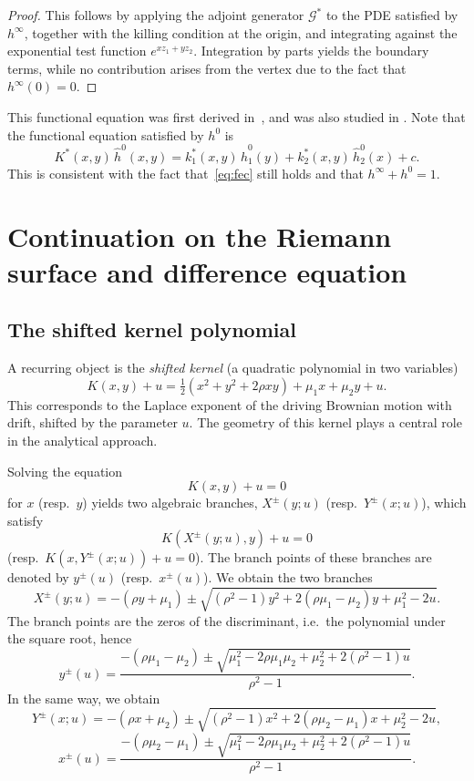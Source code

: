 \documentclass[11pt]{article}
\theoremstyle{definition}
\begin{document}
\begin{proof}
This follows by applying the adjoint generator $\mathcal{G}^*$ to the PDE satisfied by $h^\infty$, together with the killing condition at the origin, and integrating against the exponential test function $e^{x z_1+y z_2}$. Integration by parts yields the boundary terms, while no contribution arises from the vertex due to the fact that $h^\infty(0)=0$.
\end{proof}
This functional equation was first derived in~\cite{franceschi_ernst_huang_escape_2021}, and was also studied in
\cite{franceschi_flin_sumofexponential_2024}.
Note that the functional equation satisfied by $h^0$ is
\[
K^*(x,y)\,\widehat h^0(x,y)
=
k_1^*(x,y)\,\widehat h^0_1(y)
+
k_2^*(x,y)\,\widehat h^0_2(x)
+
c.
\]
This is consistent with the fact that~\eqref{eq:fec} still holds and that $h^\infty + h^0 = 1$.


\section{Continuation on the Riemann surface and difference equation}
\label{sec:contRiem}

\subsection{The shifted kernel polynomial}
\label{sec:shiftk}

A recurring object is the \emph{shifted kernel} (a quadratic polynomial in two variables)
\[
K(x,y)+u=\tfrac12(x^2+y^2+2\rho xy)+\mu_1 x+\mu_2 y + u.
\]
This corresponds to the Laplace exponent of the driving Brownian motion with drift, shifted by the parameter $u$. The geometry of this kernel plays a central role in the analytical approach.

Solving the equation 
$$K(x,y)+u=0$$ 
for $x$ (resp.\ $y$) yields two algebraic branches, $X^\pm(y;u)$ (resp.\ $Y^\pm(x;u)$), which satisfy $$K(X^\pm(y;u),y)+u=0$$ (resp.\ $K(x,Y^\pm(x;u))+u=0$). The branch points of these branches are denoted by $y^\pm(u)$ (resp.\ $x^\pm(u)$).
We obtain the two branches
\[
X^\pm(y;u)=-(\rho y+\mu_1)\pm \sqrt{(\rho^2-1)y^2+2(\rho\mu_1-\mu_2)y+\mu_1^2 - 2u}.
\]
The branch points are the zeros of the discriminant, i.e.\ the polynomial under the square root, hence
\[
y^\pm(u)=\frac{-(\rho\mu_1-\mu_2)\pm\sqrt{\mu_1^2 -2\rho\mu_1\mu_2+\mu_2^2 + 2(\rho^2-1)u}}{\rho^2-1}.
\]
In the same way, we obtain
\[
Y^\pm(x;u)=-(\rho x+\mu_2)\pm \sqrt{(\rho^2-1)x^2 + 2(\rho\mu_2-\mu_1)x + \mu_2^2 - 2u},
\]
\[
x^\pm(u)=\frac{-(\rho\mu_2-\mu_1)\pm\sqrt{\mu_1^2 - 2\rho\mu_1\mu_2 + \mu_2^2 + 2(\rho^2-1)u}}{\rho^2-1}.
\]
\end{document}
